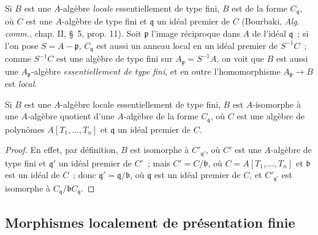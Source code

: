 
\begin{env}[1.3.10]
\label{IV.1.3.10-fr}
Si $B$ est une $A$-algèbre \emph{locale} essentiellement de type fini, $B$ est
de la forme $C_{\mathfrak q}$, où $C$ est une $A$-algèbre de type fini et
$\mathfrak q$ un idéal premier de $C$ (Bourbaki, \emph{Alg. comm.}, chap. II,
\S~5, prop. 11). Soit $\mathfrak p$ l'image réciproque dans $A$ de l'idéal
$\mathfrak q$~; si l'on pose $S=A-\mathfrak p$, $C_{\mathfrak q}$ est aussi un
anneau local en un idéal premier de $S^{-1}C$~; comme $S^{-1}C$ est une
algèbre de type fini sur $A_{\mathfrak p}=S^{-1}A$, on voit que $B$ est aussi
une $A_{\mathfrak p}$-algèbre \emph{essentiellement de type fini}, et en outre
l'homomorphisme $A_{\mathfrak p}\to B$ est \emph{local}.
\end{env}

\begin{proposition}[1.3.11]
\label{IV.1.3.11-fr}
Si $B$ est une $A$-algèbre locale essentiellement de type fini, $B$ est
$A$-isomorphe à une $A$-algèbre quotient d'une $A$-algèbre de la forme
$C_{\mathfrak q}$, où $C$ est une algèbre de polynômes
$A[T_1,\ldots,T_n]$ et $\mathfrak q$ un idéal premier de $C$.
\end{proposition}

\begin{proof}
En effet, par définition, $B$ est isomorphe à $C'_{\mathfrak q'}$, où $C'$ est
une $A$-algèbre de type fini et $\mathfrak q'$ un idéal premier de $C'$~; mais
$C'=C/\mathfrak b$, où $C=A[T_1,\ldots,T_n]$ et $\mathfrak b$ est un idéal de
$C$~; donc $\mathfrak q'=\mathfrak q/\mathfrak b$, où $\mathfrak q$ est un
idéal premier de $C$, et $C'_{\mathfrak q'}$ est isomorphe à
$C_{\mathfrak q}/\mathfrak bC_{\mathfrak q}$.
\end{proof}

\subsection{Morphismes localement de présentation finie}
\label{subsection:IV.1.4-fr}

